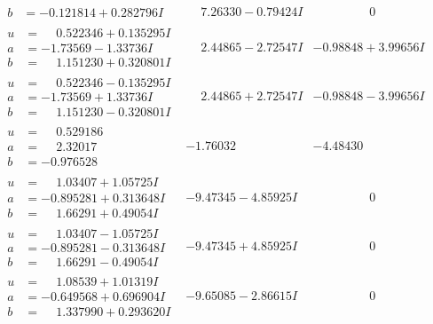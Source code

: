 \documentclass[1p]{elsarticle_modified}
\theoremstyle{definition}
\begin{document}
$$\begin{array}{c|c|c}
\begin{aligned}
b &= -0.121814 + 0.282796 I\end{aligned}
 & \phantom{-}7.26330 - 0.79424 I & \phantom{-0.000000 } 0 \\ \hline\begin{aligned}
u &= \phantom{-}0.522346 + 0.135295 I \\
a &= -1.73569 - 1.33736 I \\
b &= \phantom{-}1.151230 + 0.320801 I\end{aligned}
 & \phantom{-}2.44865 - 2.72547 I & -0.98848 + 3.99656 I \\ \hline\begin{aligned}
u &= \phantom{-}0.522346 - 0.135295 I \\
a &= -1.73569 + 1.33736 I \\
b &= \phantom{-}1.151230 - 0.320801 I\end{aligned}
 & \phantom{-}2.44865 + 2.72547 I & -0.98848 - 3.99656 I \\ \hline\begin{aligned}
u &= \phantom{-}0.529186\phantom{ +0.000000I} \\
a &= \phantom{-}2.32017\phantom{ +0.000000I} \\
b &= -0.976528\phantom{ +0.000000I}\end{aligned}
 & -1.76032\phantom{ +0.000000I} & -4.48430\phantom{ +0.000000I} \\ \hline\begin{aligned}
u &= \phantom{-}1.03407 + 1.05725 I \\
a &= -0.895281 + 0.313648 I \\
b &= \phantom{-}1.66291 + 0.49054 I\end{aligned}
 & -9.47345 - 4.85925 I & \phantom{-0.000000 } 0 \\ \hline\begin{aligned}
u &= \phantom{-}1.03407 - 1.05725 I \\
a &= -0.895281 - 0.313648 I \\
b &= \phantom{-}1.66291 - 0.49054 I\end{aligned}
 & -9.47345 + 4.85925 I & \phantom{-0.000000 } 0 \\ \hline\begin{aligned}
u &= \phantom{-}1.08539 + 1.01319 I \\
a &= -0.649568 + 0.696904 I \\
b &= \phantom{-}1.337990 + 0.293620 I\end{aligned}
 & -9.65085 - 2.86615 I & \phantom{-0.000000 } 0 \\ \hline\begin{aligned}

\end{aligned}
\end{array}$$
\end{document}
